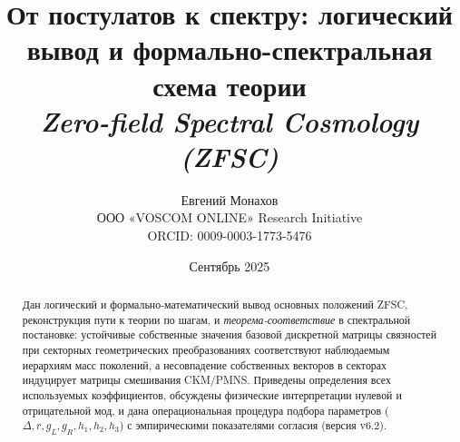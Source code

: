 \documentclass[12pt,a4paper]{article}
\title{От постулатов к спектру: логический вывод и формально-спектральная схема теории \\ 
\textit{Zero-field Spectral Cosmology (ZFSC)}}
\author{Евгений Монахов \\ ООО «VOSCOM ONLINE» Research Initiative \\ ORCID: 0009-0003-1773-5476}
\date{Сентябрь 2025}
\theoremstyle{definition}
\theoremstyle{plain}
\theoremstyle{remark}
\begin{document}
\maketitle

\begin{abstract}
Дан логический и формально-математический вывод основных положений ZFSC, реконструкция пути к теории по шагам, и \emph{теорема-соответствие} в спектральной постановке: устойчивые собственные значения базовой дискретной матрицы связностей при секторных геометрических преобразованиях соответствуют наблюдаемым иерархиям масс поколений, а несовпадение собственных векторов в секторах индуцирует матрицы смешивания CKM/PMNS. Приведены определения всех используемых коэффициентов, обсуждены физические интерпретации нулевой и отрицательной мод, и дана операциональная процедура подбора параметров (\(\Delta,r,g_L,g_R,h_1,h_2,h_3\)) с эмпирическими показателями согласия (версия v6.2).
\end{abstract}

\tableofcontents
\end{document}

